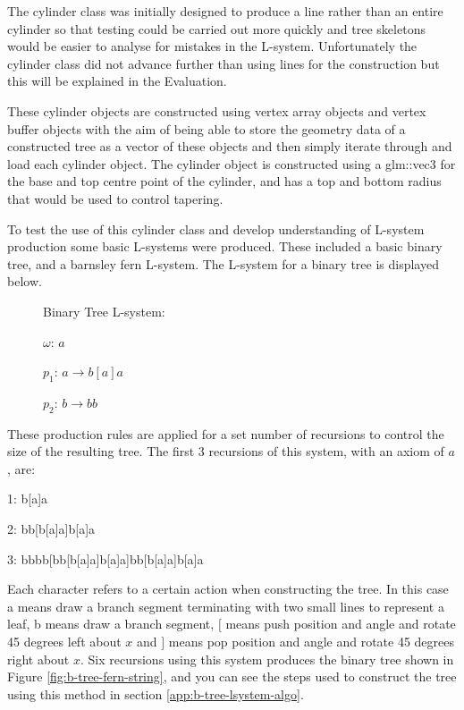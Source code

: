 \documentclass[final]{cmpreport}
\begin{document}
The cylinder class was initially designed to produce a line rather than an entire cylinder so that 
testing could be carried out more quickly and tree skeletons would be easier to analyse for 
mistakes in the L-system. Unfortunately the cylinder class did not advance further than using 
lines for the construction but this will be explained in the Evaluation. 

These cylinder objects are constructed using vertex array objects and vertex buffer objects with 
the aim of being able to store the geometry data of a constructed tree as a vector of these 
objects and then simply iterate through and load each cylinder object. The cylinder object is 
constructed using a glm::vec3 for the base and top centre point of the cylinder, and has a top 
and bottom radius that would be used to control tapering. 

To test the use of this cylinder class and develop understanding of L-system production some 
basic L-systems were produced. These included a basic binary tree, and a barnsley fern L-system.
The L-system for a binary tree is displayed below.

\begin{figure}[ht]
    Binary Tree L-system:

    $\omega$: $a$ 

    $p_1$: $a \rightarrow b[a]a$

    $p_2$: $b \rightarrow bb$
    \label{fig:b-tree-string-system}
\end{figure}

These production rules are applied for a set number of recursions to control the size of the 
resulting tree. The first 3 recursions of this system, with an axiom of $a$, are:

1: b[a]a

2: bb[b[a]a]b[a]a

3: bbbb[bb[b[a]a]b[a]a]bb[b[a]a]b[a]a

Each character refers to a certain action when constructing the tree. In this case a means draw 
a branch segment terminating with two small lines to represent a leaf, b means draw a branch 
segment, $[$ means push position and angle and rotate 45 degrees left about $x$ and $]$ means 
pop position and angle and rotate 45 degrees right about $x$. Six recursions using this system 
produces the binary tree shown in Figure \ref{fig:b-tree-fern-string}, and you can see the 
steps used to construct the tree using this method in section \ref{app:b-tree-lsystem-algo}.
\end{document}
